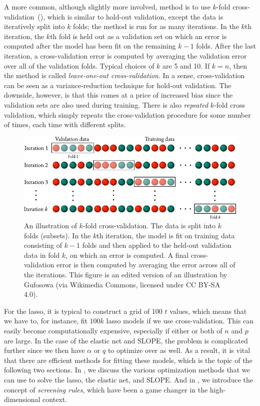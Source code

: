 A more common, although slightly more involved, method is to use \(k\)-fold cross-validation~(), which is similar to hold-out validation, except the data is iteratively split into \(k\) folds; the method is run for as many iterations. In the \(k\)th iteration, the \(k\)th fold is held out as a validation set on which an error is computed after the model has been fit on the remaining \(k-1\) folds. After the last iteration, a cross-validation error is computed by averaging the validation error over all of the validation folds. Typical choices of \(k\) are 5 and 10. If \(k=n\), then the method is called \emph{leave-one-out cross-validation}. In a sense, cross-validation can be seen as a variance-reduction technique for hold-out validation. The downside, however, is that this comes at a price of increased bias since the validation sets are also used during training. There is also \emph{repeated} \(k\)-fold cross validation, which simply repeats the cross-validation procedure for some number of times, each time with different splits.

\begin{figure}[htpb]
  \centering
  \includegraphics[width=\textwidth]{figures/kfold-cv.pdf}
  \caption{%
    An illustration of \(k\)-fold cross-validation. The data is split into \(k\) folds (subsets). In the \(k\)th iteration, the model is fit on training data consisting of \(k-1\) folds and then applied to the held-out validation data in fold \(k\), on which an error is computed. A final cross-validation error is then computed by averaging the error across all of the iterations.
    This figure is an edited version of an illustration by Gufosowa (via Wikimedia Commons, licensed under CC BY-SA 4.0).
  }
  \label{fig:k-fold-cv}
\end{figure}

For the lasso, it is typical to construct a grid of 100 \(t\) values, which means that we have to, for instance, fit \(100k\) lasso models if we use cross-validation. This can easily become computationally expensive, especially if either or both of \(n\) and \(p\) are large. In the case of the elastic net and SLOPE, the problem is complicated further since we then have \(\alpha\) or \(q\) to optimize over as well. As a result, it is vital that there are efficient methods for fitting these models, which is the topic of the following two sections. In , we discuss the various optimization methods that we can use to solve the lasso, the elastic net, and SLOPE. And in , we introduce the concept of \emph{screening rules}, which have been a game changer in the high-dimensional context.

